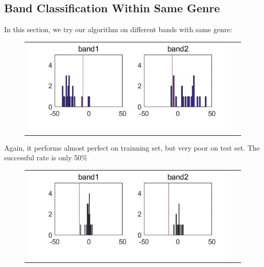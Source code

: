 \documentclass[12pt]{article}
\begin{document}
\subsection{Band Classification Within Same Genre}
In this section, we try our algorithm on different bands with same genre:
\begin{figure}[H]
\begin{tabular}{cc}
  \includegraphics[width=\textwidth]{band_genre.jpg}
\end{tabular}
\end{figure}
Again, it performs almost perfect on trainning set, but very poor on test set. The successful rate is only 50\%
\begin{figure}[H]
\begin{tabular}{cc}
  \includegraphics[width=\textwidth]{2band_genre_test.jpg}
\end{tabular}
\end{figure}
\end{document}

